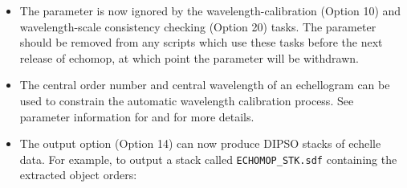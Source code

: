 \documentclass[twoside,11pt,nolof]{starlink}
\begin{document}
\begin{itemize}
\item The parameter  is
   now ignored by the wavelength-calibration
   (Option 10) and wavelength-scale consistency checking (Option 20)
   tasks.  The parameter should be removed from any scripts which use
   these tasks before the next release of {\sc echomop,} at which point the
   parameter will be withdrawn.
\item The central order number and central wavelength of an
   echellogram can be used to constrain the automatic wavelength
   calibration process.  See parameter information for
   and  for more details.
\item The output option (Option 14) can now produce DIPSO stacks of
   echelle data.  For example, to output a stack called
   \texttt{ECHOMOP\_STK.sdf} containing the extracted object orders:

\begin{terminalv}
\end{terminalv}


\end{itemize}
\end{document}

